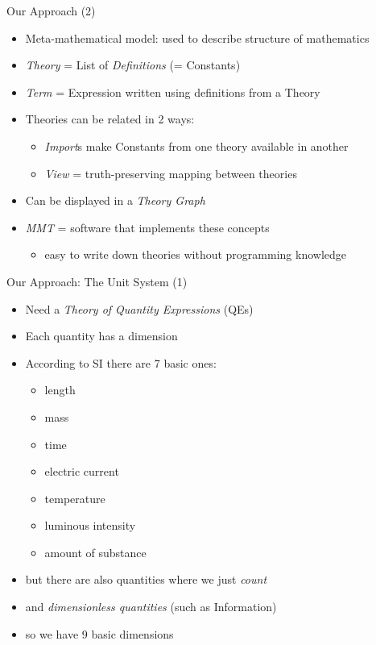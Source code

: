 \documentclass{beamer}
\begin{document}
  \begin{frame}{Our Approach (2)}
    \begin{itemize}[<+->]
      \item Meta-mathematical model: used to describe structure of mathematics

      \item \textit{Theory} = List of \textit{Definitions} (= Constants)

      \item \textit{Term} = Expression written using definitions from a Theory

      \item Theories can be related in 2 ways:
      \begin{itemize}
        \item \textit{Import}s make Constants from one theory available in another
        \item \textit{View} = truth-preserving mapping between theories
      \end{itemize}

      \item Can be displayed in a \textit{Theory Graph}

      \item \textit{MMT} = software that implements these concepts
      \begin{itemize}
        \item easy to write down theories without programming knowledge
      \end{itemize}

    \end{itemize}
  \end{frame}
  \begin{frame}{Our Approach: The Unit System (1)}
    \begin{itemize}[<+->]
      \item Need a \textit{Theory of Quantity Expressions} (QEs)

      \item Each quantity has a dimension
      \item According to SI there are 7 basic ones:
      \begin{itemize}
        \item length
        \item mass
        \item time
        \item electric current
        \item temperature
        \item luminous intensity
        \item amount of substance
      \end{itemize}
      \item but there are also quantities where we just \textit{count}
      \item and \textit{dimensionless quantities} (such as Information)
      \item so we have 9 basic dimensions
    \end{itemize}
  \end{frame}
\end{document}
